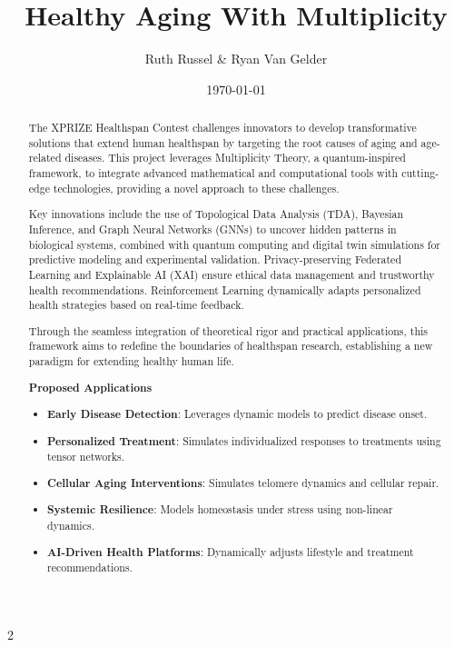 \documentclass{article}
\theoremstyle{plain}
\begin{document}
\title{Healthy Aging With Multiplicity}

\author{Ruth Russel \& Ryan Van Gelder}
\date{\today}
\maketitle

\begin{abstract}
The XPRIZE Healthspan Contest challenges innovators to develop transformative solutions that extend human healthspan by targeting the root causes of aging and age-related diseases. This project leverages Multiplicity Theory, a quantum-inspired framework, to integrate advanced mathematical and computational tools with cutting-edge technologies, providing a novel approach to these challenges.

Key innovations include the use of Topological Data Analysis (TDA), Bayesian Inference, and Graph Neural Networks (GNNs) to uncover hidden patterns in biological systems, combined with quantum computing and digital twin simulations for predictive modeling and experimental validation. Privacy-preserving Federated Learning and Explainable AI (XAI) ensure ethical data management and trustworthy health recommendations. Reinforcement Learning dynamically adapts personalized health strategies based on real-time feedback.

Through the seamless integration of theoretical rigor and practical applications, this framework aims to redefine the boundaries of healthspan research, establishing a new paradigm for extending healthy human life.


\textbf{Proposed Applications}

\begin{itemize}
    \item \textbf{Early Disease Detection}: Leverages dynamic models to predict disease onset.
    \item \textbf{Personalized Treatment}: Simulates individualized responses to treatments using tensor networks.
    \item \textbf{Cellular Aging Interventions}: Simulates telomere dynamics and cellular repair.
    \item \textbf{Systemic Resilience}: Models homeostasis under stress using non-linear dynamics.
    \item \textbf{AI-Driven Health Platforms}: Dynamically adjusts lifestyle and treatment recommendations.
\end{itemize}
\end{abstract}
\newpage
\begin{multicols}{2}
\begin{singlespace}
\tableofcontents
\end{singlespace}
\end{multicols}
\end{document}

